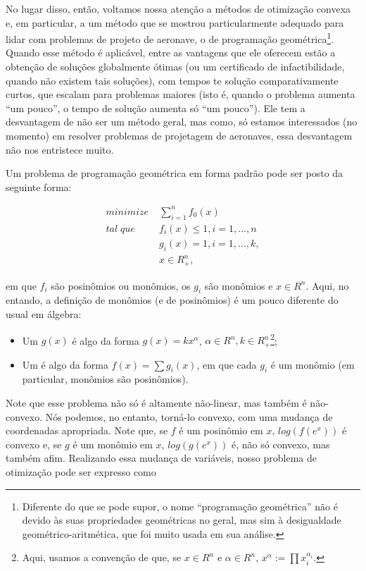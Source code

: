 \documentclass{article}
\begin{document}
No lugar disso, então, voltamos nossa atenção a métodos de otimização convexa e, em particular, a um método que se mostrou particularmente
adequado para lidar com problemas de projeto de aeronave, o de programação geométrica\footnote{Diferente do que se pode supor, o nome
  ``programação geométrica'' não é devido às suas propriedades geométricas no geral, mas sim à desigualdade geométrico-aritmética,
  que foi muito usada em sua análise.}. Quando esse método é aplicável, entre as vantagens
que ele oferecem estão a obtenção de soluções globalmente ótimas (ou um certificado de infactibilidade, quando não existem tais soluções),
com tempos te solução comparativamente curtos, que escalam para problemas maiores (isto é, quando o problema aumenta ``um pouco'', o tempo
de solução aumenta só ``um pouco''). Ele tem a desvantagem de não ser um método geral, mas como, só estamos interessados (no momento)
em resolver problemas de projetagem de aeronaves, essa desvantagem não nos entristece muito.

Um problema de programação geométrica em forma padrão pode ser posto da seguinte forma:

\begin{align*}
  minimize \;& \sum\limits_{i=1}^n  f_0(x)\\
  tal\; que\;& f_i(x) \leq 1, i  = 1, ..., n\\
             & g_i(x) = 1, i = 1, ..., k,\\
             & x \in R^n_{+},
\end{align*}

\noindent em que $f_i$ são posinômios ou monômios, os $g_i$ são monômios e $x \in R^n$. Aqui, no entando, a definição
de monômios (e de posinômios) é um pouco diferente do usual em álgebra:

\begin{itemize}
\item Um  $g(x)$ é algo da forma $g(x) = kx^{\alpha}$, $\alpha \in R^n, k \in R^n_{+}$\footnote{Aqui, usamos a convenção de que, se $x \in R^n$ e $\alpha \in R^n$, $x^{\alpha} := \prod x_i^{\alpha_i}$.};
  \item Um  é algo da forma $f(x) = \sum g_i(x)$, em que cada $g_i$ é um monômio (em particular, monômios são posinômios).
\end{itemize}

Note que esse problema não só é altamente não-linear, mas também é não-convexo. Nós podemos, no entanto, torná-lo convexo, com uma mudança de coordenadas apropriada. Note que, se $f$ é um posinômio em $x$, $log(f(e^x))$ é convexo e, se $g$ é um monômio em $x$, $log(g(e^x))$ é, não só
convexo, mas também afim. Realizando essa mudança de variáveis, nosso problema de otimização pode ser expresso como
\end{document}
